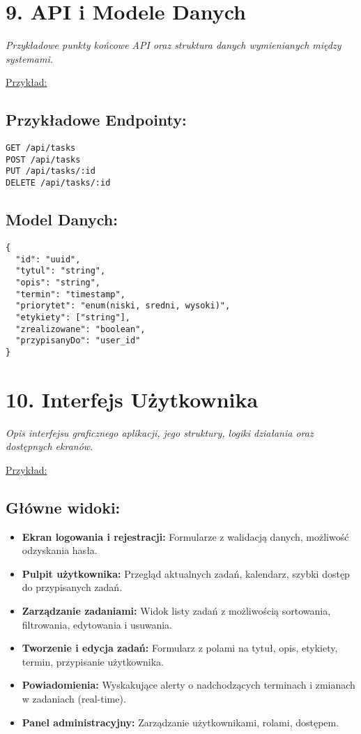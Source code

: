 \documentclass[a4paper,12pt]{article}
\begin{document}
\section*{9. API i Modele Danych}
\textit{Przykładowe punkty końcowe API oraz struktura danych wymienianych między systemami.}

\vspace{0.5 cm}
 \noindent
\underline{Przykład:} 
\subsection*{Przykładowe Endpointy:}
\begin{verbatim}
GET /api/tasks
POST /api/tasks
PUT /api/tasks/:id
DELETE /api/tasks/:id
\end{verbatim}

\subsection*{Model Danych:}
\begin{verbatim}
{
  "id": "uuid",
  "tytul": "string",
  "opis": "string",
  "termin": "timestamp",
  "priorytet": "enum(niski, sredni, wysoki)",
  "etykiety": ["string"],
  "zrealizowane": "boolean",
  "przypisanyDo": "user_id"
}
\end{verbatim}

\section*{10. Interfejs Użytkownika}
\textit{Opis interfejsu graficznego aplikacji, jego struktury, logiki działania oraz dostępnych ekranów.}

\vspace{0.5 cm}
 \noindent
\underline{Przykład:} 
\subsection*{Główne widoki:}
\begin{itemize}
    \item \textbf{Ekran logowania i rejestracji:} Formularze z walidacją danych, możliwość odzyskania hasła.
    \item \textbf{Pulpit użytkownika:} Przegląd aktualnych zadań, kalendarz, szybki dostęp do przypisanych zadań.
    \item \textbf{Zarządzanie zadaniami:} Widok listy zadań z możliwością sortowania, filtrowania, edytowania i usuwania.
    \item \textbf{Tworzenie i edycja zadań:} Formularz z polami na tytuł, opis, etykiety, termin, przypisanie użytkownika.
    \item \textbf{Powiadomienia:} Wyskakujące alerty o nadchodzących terminach i zmianach w zadaniach (real-time).
    \item \textbf{Panel administracyjny:} Zarządzanie użytkownikami, rolami, dostępem.
\end{itemize}
\end{document}
